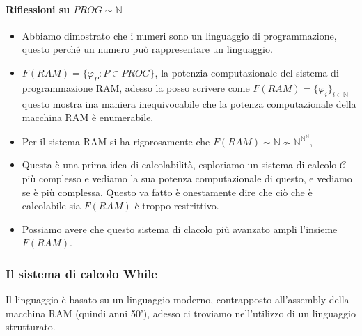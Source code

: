\documentclass{article}
\begin{document}
\paragraph{Riflessioni su $PROG\sim\mathbb{N}$}
\begin{itemize}
    \item Abbiamo dimostrato che i numeri sono un linguaggio di programmazione, questo
          perché un numero può rappresentare un linguaggio.

    \item $F(RAM)=\{\varphi_P :P\in PROG\}$, la potenzia computazionale del sistema di programmazione
          RAM, adesso la posso scrivere come $F(RAM)=\{\varphi_i\}_{i\in\mathbb{N}}$ questo mostra ina maniera inequivocabile che la potenza
          computazionale della macchina RAM è enumerabile.

    \item Per il sistema RAM si ha rigorosamente che $F(RAM)\sim\mathbb{N}\nsim\mathbb{N}^{\mathbb{N}^\mathbb{N}}$,

    \item Questa è una prima idea di calcolabilità, esploriamo un sistema di calcolo $\mathcal{C}$ più complesso
          e vediamo la sua potenza computazionale di questo, e vediamo se è più complessa. Questo va fatto è onestamente
          dire che ciò che è calcolabile sia $F(RAM)$ è troppo restrittivo.

    \item Possiamo avere che questo sistema di clacolo più avanzato ampli l'insieme $F(RAM)$.
\end{itemize}

\subsubsection{Il sistema di calcolo While}
Il linguaggio è basato su un linguaggio moderno, contrapposto all'assembly della macchina RAM (quindi
anni 50'), adesso ci troviamo nell'utilizzo di un linguaggio strutturato.
\end{document}
